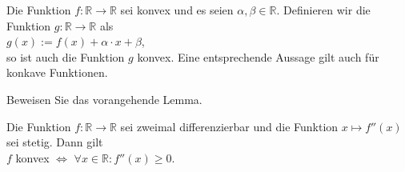 \begin{Lemma}
  \label{lemma:konvex_invarianz} \lb
  Die Funktion $f:\mathbb{R} \rightarrow \mathbb{R}$ sei konvex und es seien $\alpha, \beta \in \mathbb{R}$.
  Definieren wir die Funktion $g:\mathbb{R} \rightarrow \mathbb{R}$ als
  \\[0.2cm]
  \hspace*{1.3cm}
  $g(x) := f(x) + \alpha \cdot x + \beta$,
  \\[0.2cm]
  so ist auch die Funktion $g$ konvex.  Eine entsprechende Aussage gilt auch f\"ur konkave Funktionen.
\end{Lemma}

\exercise
Beweisen Sie das vorangehende Lemma. \eox

\begin{Satz}
Die Funktion $f:\mathbb{R} \rightarrow \mathbb{R}$ sei zweimal differenzierbar und die Funktion 
$x \mapsto f''(x)$ sei stetig.  Dann gilt 
\\[0.2cm]
\hspace*{1.3cm}
$f$  konvex \quad $\Leftrightarrow$ \quad $\forall x \in \mathbb{R}: f''(x) \geq 0$.
\end{Satz}

